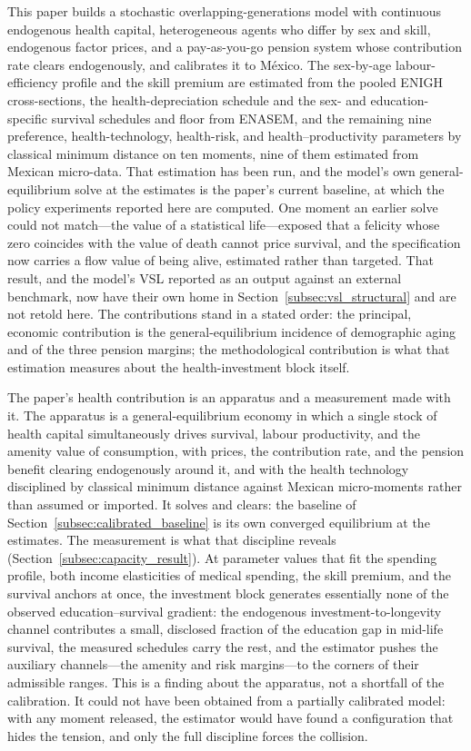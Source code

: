 \documentclass[12pt,a4paper]{article}
\begin{document}
This paper builds a stochastic overlapping-generations model with continuous endogenous health capital, heterogeneous agents who differ by sex and skill, endogenous factor prices, and a pay-as-you-go pension system whose contribution rate clears endogenously, and calibrates it to M\'exico. The sex-by-age labour-efficiency profile and the skill premium are estimated from the pooled ENIGH cross-sections, the health-depreciation schedule and the sex- and education-specific survival schedules and floor from ENASEM, and the remaining nine preference, health-technology, health-risk, and health--productivity parameters by classical minimum distance on ten moments, nine of them estimated from Mexican micro-data. That estimation has been run, and the model's own general-equilibrium solve at the estimates is the paper's current baseline, at which the policy experiments reported here are computed. One moment an earlier solve could not match---the value of a statistical life---exposed that a felicity whose zero coincides with the value of death cannot price survival, and the specification now carries a flow value of being alive, estimated rather than targeted. That result, and the model's VSL reported as an output against an external benchmark, now have their own home in Section~\ref{subsec:vsl_structural} and are not retold here. The contributions stand in a stated order: the principal, economic contribution is the general-equilibrium incidence of demographic aging and of the three pension margins; the methodological contribution is what that estimation measures about the health-investment block itself.

The paper's health contribution is an apparatus and a measurement made with it. The apparatus is a general-equilibrium economy in which a single stock of health capital simultaneously drives survival, labour productivity, and the amenity value of consumption, with prices, the contribution rate, and the pension benefit clearing endogenously around it, and with the health technology disciplined by classical minimum distance against Mexican micro-moments rather than assumed or imported. It solves and clears: the baseline of Section~\ref{subsec:calibrated_baseline} is its own converged equilibrium at the estimates. The measurement is what that discipline reveals (Section~\ref{subsec:capacity_result}). At parameter values that fit the spending profile, both income elasticities of medical spending, the skill premium, and the survival anchors at once, the investment block generates essentially none of the observed education--survival gradient: the endogenous investment-to-longevity channel contributes a small, disclosed fraction of the education gap in mid-life survival, the measured schedules carry the rest, and the estimator pushes the auxiliary channels---the amenity and risk margins---to the corners of their admissible ranges. This is a finding about the apparatus, not a shortfall of the calibration. It could not have been obtained from a partially calibrated model: with any moment released, the estimator would have found a configuration that hides the tension, and only the full discipline forces the collision.
\end{document}

